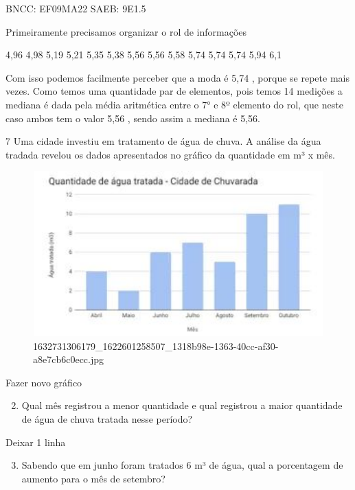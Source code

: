 \begin{escolha}
{{{\begin{escolha}
{{{{{\begin{escolha}
\begin{escolha}
{\begin{q°}
BNCC: EF09MA22 SAEB: 9E1.5

Primeiramente precisamos organizar o rol de informações

4,96 4,98 5,19 5,21 5,35 5,38 5,56 5,56 5,58 5,74 5,74 5,74 5,94 6,1

Com isso podemos facilmente perceber que a moda é 5,74 , porque se
repete mais vezes. Como temos uma quantidade par de elementos, pois
temos 14 medições a mediana é dada pela média aritmética entre o 7° e 8º
elemento do rol, que neste caso ambos tem o valor 5,56 , sendo assim a
mediana é 5,56.

\num{7} Uma cidade investiu em tratamento de água de chuva. A análise da água
tradada revelou os dados apresentados no gráfico da quantidade em m³ x
mês.

\begin{figure}
\centering
\includegraphics[width=4.95586in,height=2.50694in]{./_SAEB_9_MAT/media/image216.jpg}
\caption{1632731306179\_1622601258507\_1318b98e-1363-40cc-af30-a8e7cb6c0ecc.jpg}
\end{figure}

Fazer novo gráfico

\begin{enumerate}

\setcounter{enumi}{1}
\tightlist
\item
  Qual mês registrou a menor quantidade e qual registrou a maior
  quantidade de água de chuva tratada nesse período?
\end{enumerate}

Deixar 1 linha

\begin{enumerate}

\setcounter{enumi}{2}
\tightlist
\item
  Sabendo que em junho foram tratados 6 m³ de água, qual a porcentagem
  de aumento para o mês de setembro?
\end{enumerate}


\end{q°}}
\end{escolha}
\end{escolha}}}}}}
\end{escolha}}}}
\end{escolha}
